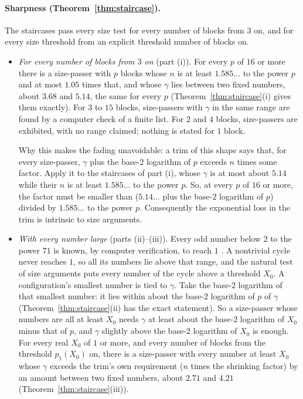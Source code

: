 \documentclass[11pt]{article}
\theoremstyle{remark}
\begin{document}
\paragraph{Sharpness (Theorem~\ref{thm:staircase}).} The staircases pass every size test for every number of blocks from $3$ on, and for every size threshold from an explicit threshold number of blocks on.
\begin{itemize}
\item \emph{For every number of blocks from $3$ on} (part (i)). For every $p$ of $16$ or more there is a size-passer with $p$ blocks whose $n$ is at least $1.585\ldots$ to the power $p$ and at most $1.05$ times that, and whose $\gamma$ lies between two fixed numbers, about $3.68$ and $5.14$, the same for every $p$ (Theorem~\ref{thm:staircase}(i) gives them exactly). For $3$ to $15$ blocks, size-passers with $\gamma$ in the same range are found by a computer check of a finite list. For $2$ and $4$ blocks, size-passers are exhibited, with no range claimed; nothing is stated for $1$ block.

Why this makes the fading unavoidable: a trim of this shape says that, for every size-passer, $\gamma$ plus the base-$2$ logarithm of $p$ exceeds $n$ times some factor. Apply it to the staircases of part (i), whose $\gamma$ is at most about $5.14$ while their $n$ is at least $1.585\ldots$ to the power $p$. So, at every $p$ of $16$ or more, the factor must be smaller than ($5.14\ldots$ plus the base-$2$ logarithm of $p$) divided by $1.585\ldots$ to the power $p$. Consequently the exponential loss in the trim is intrinsic to size arguments.
\item \emph{With every number large} (parts (ii)--(iii)). Every odd number below $2$ to the power $71$ is known, by computer verification, to reach $1$ \cite{barina}. A nontrivial cycle never reaches $1$, so all its numbers lie above that range, and the natural test of size arguments puts every number of the cycle above a threshold $X_0$. A configuration's smallest number is tied to $\gamma$. Take the base-$2$ logarithm of that smallest number: it lies within about the base-$2$ logarithm of $p$ of $\gamma$ (Theorem~\ref{thm:staircase}(ii) has the exact statement). So a size-passer whose numbers are all at least $X_0$ needs $\gamma$ at least about the base-$2$ logarithm of $X_0$ minus that of $p$, and $\gamma$ slightly above the base-$2$ logarithm of $X_0$ is enough. For every real $X_0$ of $1$ or more, and every number of blocks from the threshold $p_1(X_0)$ on, there is a size-passer with every number at least $X_0$ whose $\gamma$ exceeds the trim's own requirement ($n$ times the shrinking factor) by an amount between two fixed numbers, about $2.71$ and $4.21$ (Theorem~\ref{thm:staircase}(iii)).


\end{itemize}
\end{document}
